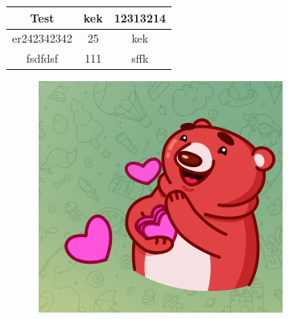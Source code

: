 \begin{tabular}{|c|c|c|}
\hline
Test & kek & 12313214 \\
\hline
er242342342 & 25 & kek \\
\hline
fsdfdsf & 111 & sffk \\
\hline
\end{tabular}\begin{figure}[h!]
\centering
\includegraphics{pic.png}
\end{figure}